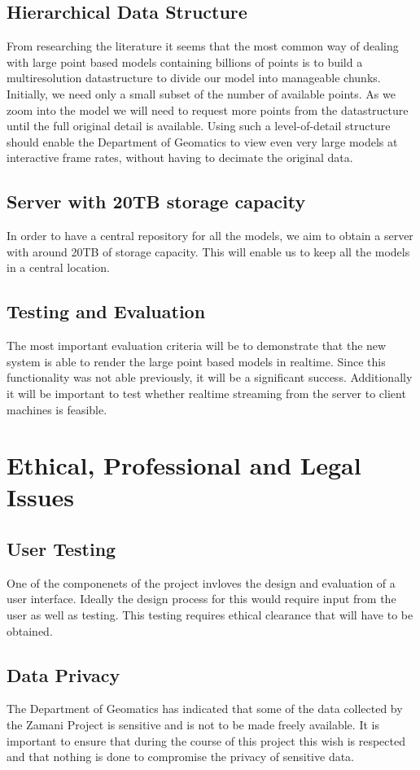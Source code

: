 \documentclass[12pt,a4paper]{article}
\begin{document}
\subsection{Hierarchical Data Structure}
From researching the literature it seems that the most common way of dealing
with large point based models containing billions of points is to build a
multiresolution datastructure to divide our model into manageable chunks.
Initially, we need only a small subset of the number of available points.
As we zoom into the model we will need to request more points from the
datastructure until the full original detail is available. Using such a
level-of-detail structure should enable the Department of Geomatics to
view even very large models at interactive frame rates, without having
to decimate the original data.
\subsection{Server with 20TB storage capacity}
In order to have a central repository for all the models, we aim to obtain a server
with around 20TB of storage capacity. This will enable us to keep all the models in
a central location.
\subsection{Testing and Evaluation}
The most important evaluation criteria will be to demonstrate that the new system is able to render the large point based models in realtime. Since this functionality was not able previously, it will be a significant success. Additionally it will be important to test whether realtime streaming from the server to client machines is feasible.

\section{Ethical, Professional and Legal Issues}
\subsection{User Testing}
One of the componenets of the project invloves the design and evaluation
of a user interface. Ideally the design process for this would require
input from the user as well as testing. This testing requires ethical clearance
that will have to be obtained.
\subsection{Data Privacy}
The Department of Geomatics has indicated that some of the data collected by
the Zamani Project is sensitive and is not to be made freely available. It is
important to ensure that during the course of this project this wish is respected
and that nothing is done to compromise the privacy of sensitive data.
\end{document}
